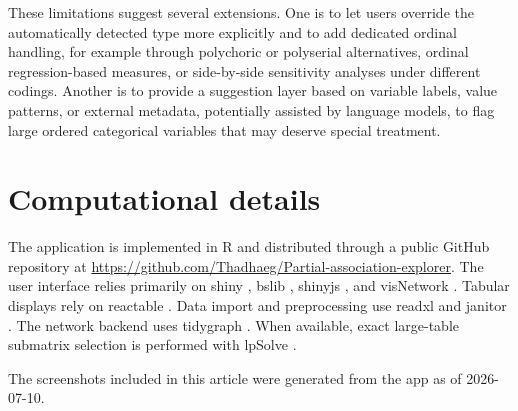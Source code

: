 \documentclass[11pt]{article}
\newcommand{\pkg}[1]{\textsf{#1}}
\newcommand{\proglang}[1]{\textsf{#1}}
\begin{document}
These limitations suggest several extensions. One is to let users override the
automatically detected type more explicitly and to add dedicated ordinal
handling, for example through polychoric or polyserial alternatives, ordinal
regression-based measures, or side-by-side sensitivity analyses under different
codings. Another is to provide a suggestion layer based on variable labels,
value patterns, or external metadata, potentially assisted by language models,
to flag large ordered categorical variables that may deserve special treatment.

\section*{Computational details}

The application is implemented in \proglang{R} and distributed through a public
GitHub repository at
\url{https://github.com/Thadhaeg/Partial-association-explorer}. The user
interface relies primarily on \pkg{shiny} \citep{Shiny}, \pkg{bslib}
\citep{bslib}, \pkg{shinyjs} \citep{shinyjs}, and \pkg{visNetwork}
\citep{VisNetwork}. Tabular displays rely on \pkg{reactable}
\citep{reactable}. Data import and preprocessing use \pkg{readxl}
\citep{readxl} and \pkg{janitor} \citep{janitor}. The network backend uses
\pkg{tidygraph} \citep{tidygraph}. When available, exact large-table submatrix
selection is performed with \pkg{lpSolve} \citep{lpSolve}.

The screenshots included in this article were generated from the app as of
2026-07-10.
\end{document}
